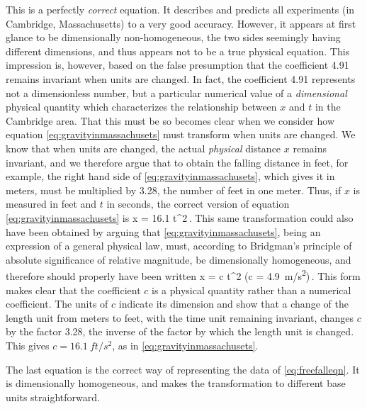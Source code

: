 This is a perfectly \emph{correct} equation. It describes and predicts all experiments (in Cambridge, Massachusetts) to a very good accuracy. However, it appears at first glance to be dimensionally non-homogeneous, the two sides seemingly having different dimensions, and thus appears not to be a true physical equation. This impression is, however, based on the false presumption that the coefficient 4.91 remains invariant when units are changed. In fact, the coefficient 4.91 represents not a dimensionless number, but a particular numerical value of a \emph{dimensional} physical quantity which characterizes the relationship between $x$ and $t$ in the Cambridge area. That this must be so becomes clear when we consider how equation \cref{eq:gravityinmassachusets} must transform when units are changed. We know that when units are changed, the actual \emph{physical} distance $x$ remains invariant, and we therefore argue that to obtain the falling distance in feet, for example, the right hand side of \cref{eq:gravityinmassachusets}, which gives it in meters, must be multiplied by 3.28, the number of feet in one meter. Thus, if $x$ is measured in feet and $t$ in seconds, the correct version of equation \cref{eq:gravityinmassachusets} is 
%
\beq
x = 16.1 t^2\,.
\eeq
%
This same transformation could also have been obtained by arguing that \cref{eq:gravityinmassachusets}, being an expression of a general physical law, must, according to Bridgman's principle of absolute significance of relative magnitude, be dimensionally homogeneous, and therefore should properly have been written
%
\beq
x = c t^2\qquad
\left(c = \SI{4.9}{m/s^2}\right)\,.
\eeq
%
This form makes clear that the coefficient $c$ is a physical quantity rather than a numerical coefficient. The units of $c$ indicate its dimension and show that a change of the length unit from meters to feet, with the time unit remaining invariant, changes $c$ by the factor 3.28, the inverse of the factor by which the length unit is changed. This gives $c = \SI{16.1}{ft/s^2}$, as in \cref{eq:gravityinmassachusets}.

The last equation is the correct way of representing the data of \cref{eq:freefalleqn}. It is dimensionally homogeneous, and makes the transformation to different base units straightforward.

